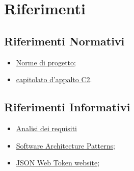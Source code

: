 \section{Riferimenti}
\subsection{Riferimenti Normativi}
\begin{itemize}
    \item \href{https://github.com/SWEasabi/norme-di-progetto/releases}{Norme di progetto};
    \item \href{https://www.math.unipd.it/~tullio/IS-1/2022/Progetto/C2.pdf}{capitolato d'appalto C2}.
\end{itemize}

\subsection{Riferimenti Informativi}
\begin{itemize}
    \item \href{https://github.com/SWEasabi/analisi-dei-requisiti/releases}{Analisi dei requisiti}
    \item \href{https://www.math.unipd.it/~rcardin/swea/2022/Software%20Architecture%20Patterns.pdf}{Software Architecture Patterns};
    \item \href{https://jwt.io/}{JSON Web Token website};
\end{itemize}